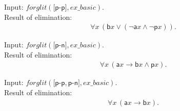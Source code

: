\documentclass[a4paper]{article}
\newcommand{\imp}{\rightarrow}
\newcommand{\pplmacro}[1]{\mathit{#1}}
\begin{document}
\noindent Input: $\pplmacro{forglit}({[}\mathsf{p}\textrm{-}\mathsf{p}{]},\pplmacro{ex\_basic}).$\\
\noindent Result of elimination:
\[\begin{array}{lllll}
\forall \mathit{x} \, (\mathsf{b}\mathit{x} \lor  (\lnot  \mathsf{a}\mathit{x} \land  \lnot  \mathsf{p}\mathit{x})).
\end{array}
\]

\noindent Input: $\pplmacro{forglit}({[}\mathsf{p}\textrm{-}\mathsf{n}{]},\pplmacro{ex\_basic}).$\\
\noindent Result of elimination:
\[\begin{array}{lllll}
\forall \mathit{x} \, (\mathsf{a}\mathit{x} \imp  \mathsf{b}\mathit{x} \land  \mathsf{p}\mathit{x}).
\end{array}
\]

\noindent Input: $\pplmacro{forglit}({[}\mathsf{p}\textrm{-}\mathsf{p},\mathsf{p}\textrm{-}\mathsf{n}{]},\pplmacro{ex\_basic}).$\\
\noindent Result of elimination:
\[\begin{array}{lllll}
\forall \mathit{x} \, (\mathsf{a}\mathit{x} \imp  \mathsf{b}\mathit{x}).
\end{array}
\]
%
%
\end{document}
